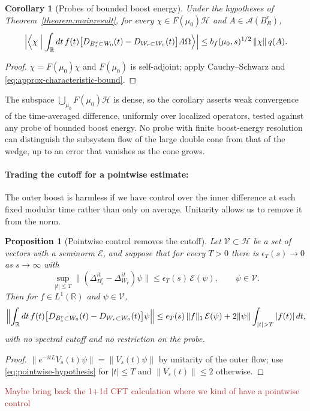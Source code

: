 \documentclass[a4paper,11pt]{article}
\newtheorem{corollary}[theorem]{Corollary}
\newtheorem{proposition}[theorem]{Proposition}
\theoremstyle{definition}
\newcommand{\KL}[1]{\textcolor{brown}{#1}}
\begin{document}
\begin{corollary}[Probes of bounded boost energy]\label{cor:probes}
Under the hypotheses of Theorem~\ref{theorem:mainresult}, for every $\chi\in F(\mu_0)\mathcal H$ and $A\in\mathcal A(B_R^r)$,
\begin{equation}
 \Bigl|\Bigl\langle\chi\Bigm|\int_{\mathbb R}dt\,f(t)\bigl[D_{B_s^r\subset W_0}(t)-D_{W_r\subset W_0}(t)\bigr]A\Omega\Bigr\rangle\Bigr|
 \le b_f(\mu_0,s)^{1/2}\,\|\chi\|\,q(A).
\end{equation}
\end{corollary}
\begin{proof}
$\chi=F(\mu_0)\chi$ and $F(\mu_0)$ is self-adjoint; apply Cauchy--Schwarz and \eqref{eq:approx-characteristic-bound}.
\end{proof}
The subspace $\bigcup_{\mu_0}F(\mu_0)\mathcal H$ is dense, so the corollary asserts weak convergence of the time-averaged difference, uniformly over localized operators, tested against any probe of bounded boost energy. No probe with finite boost-energy resolution can distinguish the subsystem flow of the large double cone from that of the wedge, up to an error that vanishes as the cone grows.

\paragraph{Trading the cutoff for a pointwise estimate:}
The outer boost is harmless if we have control over the inner difference at each fixed modular time rather than only on average. Unitarity allows us to remove it from the norm.

\begin{proposition}[Pointwise control removes the cutoff]\label{prop:pointwise}
Let $\mathcal V\subset\mathcal H$ be a set of vectors with a seminorm $\mathcal E$, and suppose that for every $T>0$ there is $\epsilon_T(s)\to0$ as $s\to\infty$ with
\begin{equation}
 \sup_{|t|\le T}\bigl\|(\Delta_{B_s^r}^{it}-\Delta_{W_r}^{it})\psi\bigr\|\le\epsilon_T(s)\,\mathcal E(\psi),\qquad\psi\in\mathcal V .
 \label{eq:pointwise-hypothesis}
\end{equation}
Then for $f\in L^1(\mathbb R)$ and $\psi\in\mathcal V$,
\begin{equation}
 \Bigl\|\int_{\mathbb R}dt\,f(t)\bigl[D_{B_s^r\subset W_0}(t)-D_{W_r\subset W_0}(t)\bigr]\psi\Bigr\|
 \le\epsilon_T(s)\,\|f\|_1\,\mathcal E(\psi)+2\|\psi\|\int_{|t|>T}|f(t)|\,dt ,
 \label{eq:pointwise-conclusion}
\end{equation}
with no spectral cutoff and no restriction on the probe.
\end{proposition}
\begin{proof}
$\|e^{-itL}V_s(t)\psi\|=\|V_s(t)\psi\|$ by unitarity of the outer flow; use \eqref{eq:pointwise-hypothesis} for $|t|\le T$ and $\|V_s(t)\|\le2$ otherwise.
\end{proof}
\KL{Maybe bring back the 1+1d CFT calculation where we kind of have a pointwise control}
\end{document}
